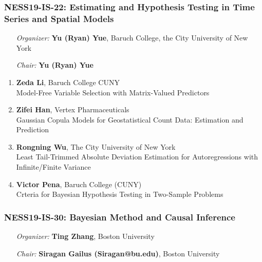 \subsubsection*{NESS19-IS-22: Estimating and Hypothesis Testing in Time Series and Spatial Models}

\begin{enumerate}[align=left]
\item [\emph{Organizer:}] \textbf{Yu (Ryan) Yue}, Baruch College, the City University of New York \\
\item [\emph{Chair:}] \textbf{Yu (Ryan) Yue}
\end{enumerate}

\begin{enumerate}
\item \textbf{Zeda Li}, Baruch College CUNY \\
Model-Free Variable Selection with Matrix-Valued Predictors
\item \textbf{Zifei Han}, Vertex Pharmaceuticals \\
Gaussian Copula Models for Geostatistical Count Data: Estimation and Prediction
\item \textbf{Rongning Wu}, The City University of New York \\
Least Tail-Trimmed Absolute Deviation Estimation for Autoregressions with Infinite/Finite Variance
\item \textbf{Victor Pena}, Baruch College (CUNY) \\
Crteria for Bayesian Hypothesis Testing in Two-Sample Problems
\end{enumerate}

\subsubsection*{NESS19-IS-30: Bayesian Method and Causal Inference}

\begin{enumerate}[align=left]
\item [\emph{Organizer:}] \textbf{Ting Zhang}, Boston University \\
\item [\emph{Chair:}] \textbf{Siragan Gailus (Siragan@bu.edu)},  Boston University
\end{enumerate}

